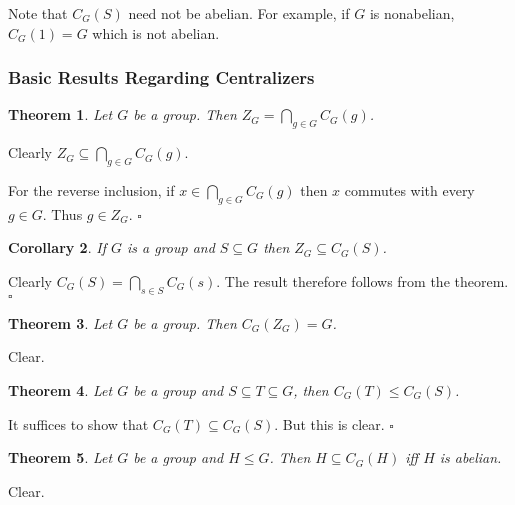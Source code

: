 \documentclass[10pt]{article}
\newtheorem{theorem}{Theorem}[section]
\newtheorem{corollary}[theorem]{Corollary}
\newenvironment{proof}[1][Proof]{\begin{trivlist}
\item[\hskip \labelsep {\itshape #1}]}{\end{trivlist}}
\begin{document}
Note that $C_G(S)$ need not be abelian. For example, if $G$ is nonabelian, $C_G(1) = G$ which is not abelian.

\subsubsection{Basic Results Regarding Centralizers}

\begin{theorem}
Let $G$ be a group. Then $Z_G = \bigcap_{g \in G} C_G(g)$.
\end{theorem}

\begin{proof}
Clearly $Z_G \subseteq \bigcap_{g \in G} C_G(g)$.

For the reverse inclusion, if $x \in \bigcap_{g \in G} C_G(g)$ then $x$ commutes with every $g \in G$. Thus $g \in Z_G$. $\square$
\end{proof}

\begin{corollary}
If $G$ is a group and $S \subseteq G$ then $Z_G \subseteq C_G(S)$.
\end{corollary}

\begin{proof}
Clearly $C_G(S) = \bigcap_{s \in S} C_G(s)$. The result therefore follows from the theorem. $\square$
\end{proof}

\begin{theorem}
Let $G$ be a group. Then $C_G(Z_G) = G$.
\end{theorem}

\begin{proof}
Clear.
\end{proof}

\begin{theorem}
Let $G$ be a group and $S \subseteq T \subseteq G$, then $C_G(T) \leq C_G(S)$.
\end{theorem}

\begin{proof}
It suffices to show that $C_G(T) \subseteq C_G(S)$. But this is clear. $\square$
\end{proof}

\begin{theorem}
Let $G$ be a group and $H \leq G$. Then $H \subseteq C_G(H)$ iff $H$ is abelian.
\end{theorem}

\begin{proof}
Clear.
\end{proof}
\end{document}

